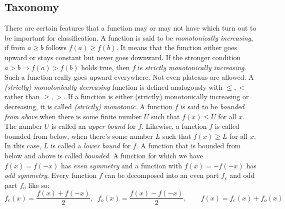 

\subsection{Taxonomy}
There are certain features that a function may or may not have which turn out to be important for classification. A function is said to be \emph{monotonically increasing}, if from $a \geq b$ follows $f(a) \geq f(b)$. It means that the function either goes upward or stays constant but never goes downward. If the stronger condition  $a > b \Rightarrow f(a) > f(b)$ holds true, then $f$ is \emph{strictly monotonically increasing}. Such a function really goes upward everywhere. Not even plateaus are allowed. A \emph{(strictly) monotonically decreasing} function is defined analogously with $\leq, <$ rather than $\geq, >$. If a function is either (strictly) monotonically increasing or decreasing, it is called \emph{(strictly) monotonic}. A function $f$ is said to be \emph{bounded from above} when there is some finite number $U$ such that $f(x) \leq U$ for all $x$. The number $U$ is called an \emph{upper bound} for $f$. Likewise, a function $f$ is called bounded from below, when there's some number $L$ such that $f(x) \geq L$ for all $x$. In this case, $L$ is called a \emph{lower bound} for $f$. A function that is bounded from below and above is called \emph{bounded}. A function for which we have $f(x) = f(-x)$ has \emph{even symmetry} and a function with $f(x) = -f(-x)$ has \emph{odd symmetry}. Every function $f$ can be decomposed into an even part $f_e$ and odd part $f_o$ like so: 
\begin{equation}
\label{Eq:EvenOddFuncDecomp}
f_e(x) = \frac{f(x) + f(-x)}{2}, \;\;
f_o(x) = \frac{f(x) - f(-x)}{2}, \qquad
f(x) = f_e(x) + f_o(x)
\end{equation}
